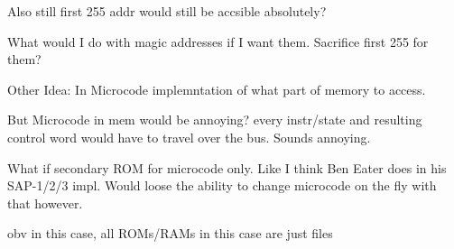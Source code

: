 Also still first 255 addr would still be accsible absolutely?

What would I do with magic addresses if I want them. Sacrifice first 255 for them?

Other Idea: In Microcode implemntation of what part of memory to access. 

But Microcode in mem would be annoying? every instr/state and resulting control word would have to travel over the bus. Sounds annoying. 

What if secondary ROM for microcode only. Like I think Ben Eater does in his SAP-1/2/3 impl.
Would loose the ability to change microcode on the fly with that however. 

obv in this case, all ROMs/RAMs in this case are just files



